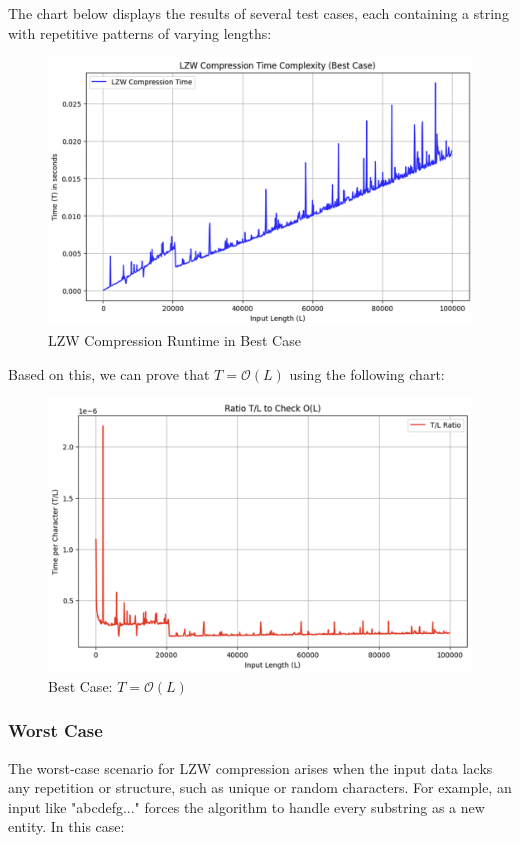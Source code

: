 \vspace{10pt}

The chart below displays the results of several test cases, each containing a string with repetitive patterns of varying lengths:

\begin{figure}[ht]
    \centering
    \includegraphics[width=0.8\linewidth]{Figures/best_case.png}
    \caption{LZW Compression Runtime in Best Case}
    \label{fig:bestcase}
\end{figure}

Based on this, we can prove that $T = \mathcal{O}(L)$ using the following chart:

\begin{figure}[ht]
    \centering
    \includegraphics[width=0.8\linewidth]{Figures/bestcase_prove.png}
    \caption{Best Case: $T = \mathcal{O}(L)$}
    \label{fig:enter-label}
\end{figure}

\newpage

\subsubsection{Worst Case}
The worst-case scenario for LZW compression arises when the input data lacks any repetition or structure, such as unique or random characters. For example, an input like "abcdefg..." forces the algorithm to handle every substring as a new entity. In this case:

